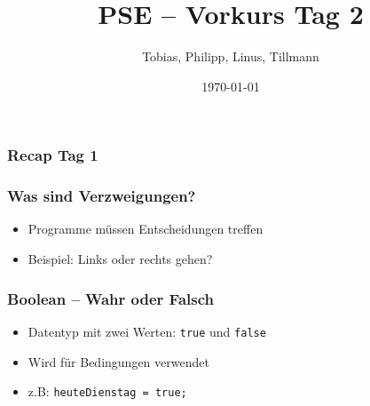 \documentclass{../../presentation}
\title{PSE – Vorkurs Tag 2}
\author{Tobias, Philipp, Linus, Tillmann}
\institute{FIUS - Fachgruppe Informatik Universität Stuttgart}
\date{\today}
\begin{document}
\begin{frame}
  \titlepage
\end{frame}

\begin{frame}
  \listoftodos
\end{frame}

\begin{frame}
  \frametitle{Recap Tag 1}
\end{frame}

\begin{frame}
  \frametitle{Was sind Verzweigungen?}
  \begin{itemize}
    \item Programme müssen Entscheidungen treffen 
    \item Beispiel: Links oder rechts gehen?
  \end{itemize}
\end{frame}

\begin{frame}
  \frametitle{Boolean – Wahr oder Falsch}
  \begin{itemize}
    \item Datentyp mit zwei Werten: \texttt{true} und \texttt{false}
    \item Wird für Bedingungen verwendet

    \item z.B: \texttt{heuteDienstag = true;}
   
    
  \end{itemize}
\end{frame}
\end{document}
